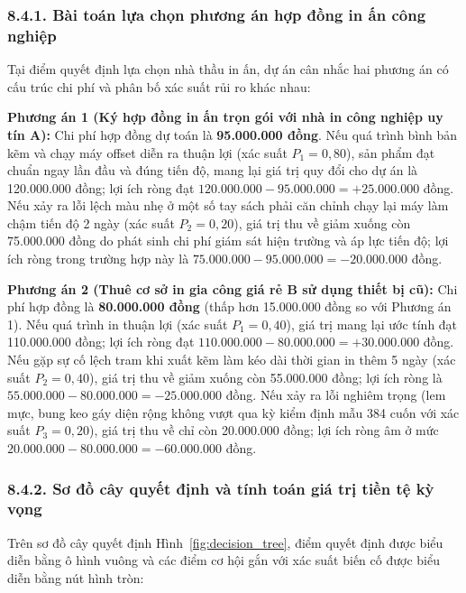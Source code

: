 \subsubsection{8.4.1. Bài toán lựa chọn phương án hợp đồng in ấn công nghiệp}

Tại điểm quyết định lựa chọn nhà thầu in ấn, dự án cân nhắc hai phương án có cấu trúc chi phí và phân bố xác suất rủi ro khác nhau:

\textbf{Phương án 1 (Ký hợp đồng in ấn trọn gói với nhà in công nghiệp uy tín A):} Chi phí hợp đồng dự toán là \textbf{95.000.000 đồng}. Nếu quá trình bình bản kẽm và chạy máy offset diễn ra thuận lợi (xác suất $P_1 = 0,80$), sản phẩm đạt chuẩn ngay lần đầu và đúng tiến độ, mang lại giá trị quy đổi cho dự án là 120.000.000 đồng; lợi ích ròng đạt $120.000.000 - 95.000.000 = +25.000.000$ đồng. Nếu xảy ra lỗi lệch màu nhẹ ở một số tay sách phải căn chỉnh chạy lại máy làm chậm tiến độ 2 ngày (xác suất $P_2 = 0,20$), giá trị thu về giảm xuống còn 75.000.000 đồng do phát sinh chi phí giám sát hiện trường và áp lực tiến độ; lợi ích ròng trong trường hợp này là $75.000.000 - 95.000.000 = -20.000.000$ đồng.

\textbf{Phương án 2 (Thuê cơ sở in gia công giá rẻ B sử dụng thiết bị cũ):} Chi phí hợp đồng là \textbf{80.000.000 đồng} (thấp hơn 15.000.000 đồng so với Phương án 1). Nếu quá trình in thuận lợi (xác suất $P_1 = 0,40$), giá trị mang lại ước tính đạt 110.000.000 đồng; lợi ích ròng đạt $110.000.000 - 80.000.000 = +30.000.000$ đồng. Nếu gặp sự cố lệch tram khi xuất kẽm làm kéo dài thời gian in thêm 5 ngày (xác suất $P_2 = 0,40$), giá trị thu về giảm xuống còn 55.000.000 đồng; lợi ích ròng là $55.000.000 - 80.000.000 = -25.000.000$ đồng. Nếu xảy ra lỗi nghiêm trọng (lem mực, bung keo gáy diện rộng không vượt qua kỳ kiểm định mẫu 384 cuốn với xác suất $P_3 = 0,20$), giá trị thu về chỉ còn 20.000.000 đồng; lợi ích ròng âm ở mức $20.000.000 - 80.000.000 = -60.000.000$ đồng.

\subsubsection{8.4.2. Sơ đồ cây quyết định và tính toán giá trị tiền tệ kỳ vọng}

Trên sơ đồ cây quyết định Hình~\ref{fig:decision_tree}, điểm quyết định được biểu diễn bằng ô hình vuông và các điểm cơ hội gắn với xác suất biến cố được biểu diễn bằng nút hình tròn:

